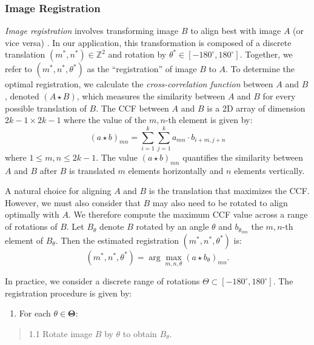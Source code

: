 \documentclass[11pt,]{isuthesis}
\providecommand{\tightlist}{%
  \setlength{\itemsep}{0pt}\setlength{\parskip}{0pt}}
\begin{document}
\hypertarget{image-registration}{%
\subsubsection{Image Registration}\label{image-registration}}

\emph{Image registration} involves transforming image \(B\) to align best with image \(A\) (or vice versa) \citep{Brown1992}.
In our application, this transformation is composed of a discrete translation \((m^*,n^*) \in \mathbb{Z}^2\) and rotation by \(\theta^* \in [-180^\circ, 180^\circ]\).
Together, we refer to \((m^*,n^*,\theta^*)\) as the ``registration'' of image \(B\) to \(A\).
To determine the optimal registration, we calculate the \emph{cross-correlation function} between \(A\) and \(B\), denoted \((A \star B)\), which measures the similarity between \(A\) and \(B\) for every possible translation of \(B\).
The CCF between \(A\) and \(B\) is a 2D array of dimension \(2k - 1 \times 2k - 1\) where the value of the \(m,n\)-th element is given by:
\[
(a \star b)_{mn} = \sum_{i=1}^k \sum_{j=1}^k a_{mn} \cdot b_{i + m,j + n}
\]
where \(1 \leq m,n \leq 2k -1\).
The value \((a \star b)_{mn}\) quantifies the similarity between \(A\) and \(B\) after \(B\) is translated \(m\) elements horizontally and \(n\) elements vertically.

A natural choice for aligning \(A\) and \(B\) is the translation that maximizes the CCF.
However, we must also consider that \(B\) may also need to be rotated to align optimally with \(A\).
We therefore compute the maximum CCF value across a range of rotations of \(B\).
Let \(B_\theta\) denote \(B\) rotated by an angle \(\theta\) and \(b_{\theta_{mn}}\) the \(m,n\)-th element of \(B_\theta\). Then the estimated registration \((m^*, n^*, \theta^*)\) is:
\[
(m^*, n^*, \theta^*) = \arg \max_{m,n,\theta} (a \star b_{\theta})_{mn}.
\]

In practice, we consider a discrete range of rotations \(\Theta \subset [-180^\circ, 180^\circ]\).
The registration procedure is given by:

\begin{enumerate}
\def\labelenumi{\arabic{enumi}.}
\tightlist
\item
  For each \(\theta \in \pmb{\Theta}\):
\end{enumerate}

\begin{quote}
1.1 Rotate image \(B\) by \(\theta\) to obtain \(B_\theta\).
\end{quote}
\end{document}

